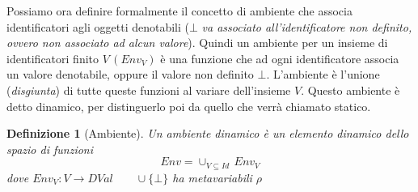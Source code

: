 \documentclass[oneside,a4paper,11pt]{book}
\theoremstyle{italicstyle}
\newtheorem{definizione}{Definizione}[section]
\theoremstyle{normStyle}
\begin{document}
Possiamo ora definire formalmente il concetto di ambiente che
associa identificatori agli oggetti denotabili ($\bot$ \textit{va associato all'identificatore non definito, 
ovvero non associato ad alcun valore}). Quindi un ambiente per un 
insieme di identificatori finito $V\,(Env_V)$ è una funzione che ad ogni 
identificatore associa un valore denotabile, oppure il valore 
non definito $\bot$. L'ambiente è l'unione (\textit{disgiunta}) 
di tutte queste funzioni al variare dell'insieme $V$. Questo ambiente è detto dinamico, per 
distinguerlo poi da quello che verrà chiamato statico.
\begin{definizione}[Ambiente]
  Un ambiente dinamico è un elemento dinamico dello spazio di funzioni
  \[
    Env = \cup_{V \subseteq Id}\,Env_V
  \]
  dove $Env_V: V \rightarrow DVal\qquad \cup\{\bot\}$ ha metavariabili $\rho$
\end{definizione}
\end{document}
